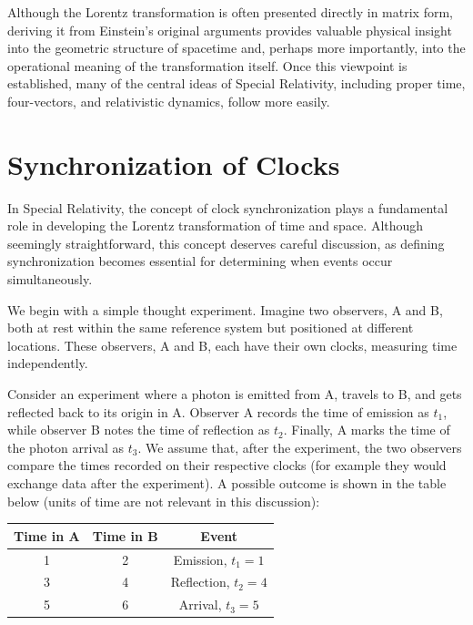 \documentclass[12pt]{article}
\begin{document}
Although the Lorentz transformation is often presented directly in matrix form,
deriving it from Einstein's original arguments provides valuable physical
insight into the geometric structure of spacetime and, perhaps more
importantly, into the operational meaning of the transformation itself. Once
this viewpoint is established, many of the central ideas of Special Relativity,
including proper time, four-vectors, and relativistic dynamics, follow
more easily. 

\section{Synchronization of Clocks}

In Special Relativity, the concept of clock synchronization plays a fundamental role in
developing the Lorentz transformation of time and space. Although seemingly straightforward,
this concept deserves careful discussion, as defining
synchronization becomes essential for determining when events occur simultaneously.

We begin with a simple thought experiment. Imagine two observers, A and B, both
at rest within the same reference system but positioned at different locations. These
observers, A and B, each have their own clocks, measuring time independently.

Consider an experiment where a photon is emitted from A, travels to B, and gets
reflected back to its origin in A. Observer A records the time of emission as $t_1$, while
observer B notes the time of reflection as $t_2$. Finally, A marks the time of the photon
arrival as $t_3$. We assume that, after the experiment, the two observers compare the times recorded on their respective clocks
(for example they would exchange data after the experiment). A possible outcome is shown in the table below (units of time are not relevant in this
discussion): 

\begin{center}
\begin{tabular}{ccc}
\toprule
Time in A & Time in B & Event \\
\midrule
1 & 2 & Emission, $t_1 = 1$ \\
3 & 4 & Reflection, $t_2 = 4$ \\
5 & 6 & Arrival, $t_3 = 5$ \\
\bottomrule
\end{tabular}
\end{center}
\end{document}

